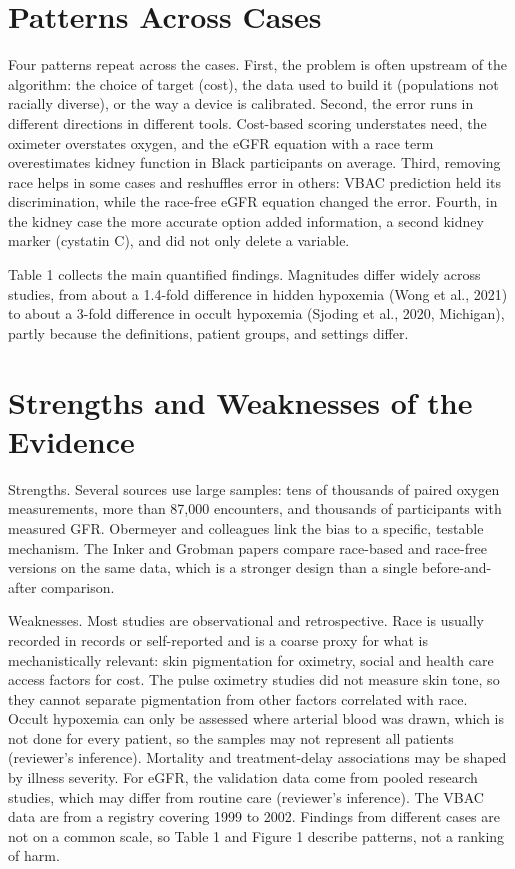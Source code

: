 \documentclass[12pt]{article}
\begin{document}
\section*{Patterns Across Cases}
Four patterns repeat across the cases. First, the problem is often upstream of the algorithm: the choice of target (cost), the data used to build it (populations not racially diverse), or the way a device is calibrated. Second, the error runs in different directions in different tools. Cost-based scoring understates need, the oximeter overstates oxygen, and the eGFR equation with a race term overestimates kidney function in Black participants on average. Third, removing race helps in some cases and reshuffles error in others: VBAC prediction held its discrimination, while the race-free eGFR equation changed the error. Fourth, in the kidney case the more accurate option added information, a second kidney marker (cystatin C), and did not only delete a variable.

Table 1 collects the main quantified findings. Magnitudes differ widely across studies, from about a 1.4-fold difference in hidden hypoxemia (Wong et al., 2021) to about a 3-fold difference in occult hypoxemia (Sjoding et al., 2020, Michigan), partly because the definitions, patient groups, and settings differ.

\section*{Strengths and Weaknesses of the Evidence}
Strengths. Several sources use large samples: tens of thousands of paired oxygen measurements, more than 87,000 encounters, and thousands of participants with measured GFR. Obermeyer and colleagues link the bias to a specific, testable mechanism. The Inker and Grobman papers compare race-based and race-free versions on the same data, which is a stronger design than a single before-and-after comparison.

Weaknesses. Most studies are observational and retrospective. Race is usually recorded in records or self-reported and is a coarse proxy for what is mechanistically relevant: skin pigmentation for oximetry, social and health care access factors for cost. The pulse oximetry studies did not measure skin tone, so they cannot separate pigmentation from other factors correlated with race. Occult hypoxemia can only be assessed where arterial blood was drawn, which is not done for every patient, so the samples may not represent all patients (reviewer's inference). Mortality and treatment-delay associations may be shaped by illness severity. For eGFR, the validation data come from pooled research studies, which may differ from routine care (reviewer's inference). The VBAC data are from a registry covering 1999 to 2002. Findings from different cases are not on a common scale, so Table 1 and Figure 1 describe patterns, not a ranking of harm.
\end{document}
